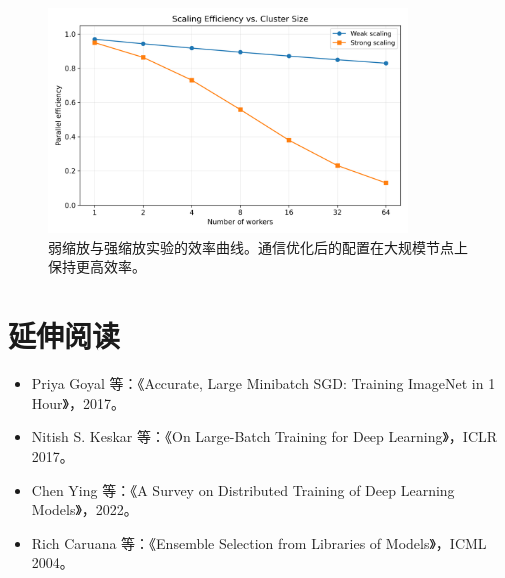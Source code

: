 \documentclass[UTF8,zihao=-4]{ctexart}
\begin{document}
\begin{figure}[H]
  \centering
  \includegraphics[width=0.85\textwidth]{scaling_efficiency.png}
  \caption{弱缩放与强缩放实验的效率曲线。通信优化后的配置在大规模节点上保持更高效率。}
  \label{fig:scaling_efficiency_cn}
\end{figure}
\FloatBarrier

\section*{延伸阅读}
\begin{itemize}
  \item Priya Goyal 等：《Accurate, Large Minibatch SGD: Training ImageNet in 1 Hour》，2017。
  \item Nitish S. Keskar 等：《On Large-Batch Training for Deep Learning》，ICLR 2017。
  \item Chen Ying 等：《A Survey on Distributed Training of Deep Learning Models》，2022。
  \item Rich Caruana 等：《Ensemble Selection from Libraries of Models》，ICML 2004。
\end{itemize}
\end{document}
